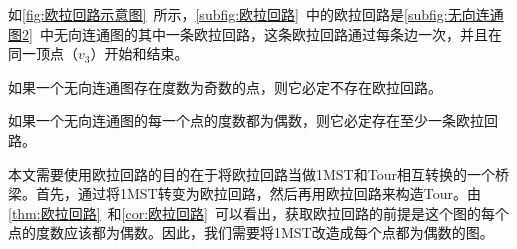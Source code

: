 \par
如\autoref{fig:欧拉回路示意图}~所示，\autoref{subfig:欧拉回路}~中的欧拉回路是\autoref{subfig:无向连通图2}~中无向连通图的其中一条欧拉回路，这条欧拉回路通过每条边一次，并且在同一顶点（$v_3$）开始和结束。
\begin{theorem}
    \label{thm:欧拉回路}
    如果一个无向连通图存在度数为奇数的点，则它必定不存在欧拉回路。
\end{theorem}
\begin{corollary}
    \label{cor:欧拉回路}
    如果一个无向连通图的每一个点的度数都为偶数，则它必定存在至少一条欧拉回路。
\end{corollary}
\par
本文需要使用欧拉回路的目的在于将欧拉回路当做1MST和Tour相互转换的一个桥梁。首先，通过将1MST转变为欧拉回路，然后再用欧拉回路来构造Tour。由\autoref{thm:欧拉回路}~和\autoref{cor:欧拉回路}~可以看出，获取欧拉回路的前提是这个图的每个点的度数应该都为偶数。因此，我们需要将1MST改造成每个点都为偶数的图。

